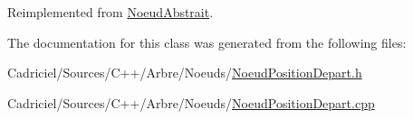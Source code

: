 Reimplemented from \hyperlink{group__inf2990_gadc6ebe69894dbb682fdd0ecb1b6c11e9}{Noeud\-Abstrait}.



The documentation for this class was generated from the following files\-:\begin{DoxyCompactItemize}
\item 
Cadriciel/\-Sources/\-C++/\-Arbre/\-Noeuds/\hyperlink{_noeud_position_depart_8h}{Noeud\-Position\-Depart.\-h}\item 
Cadriciel/\-Sources/\-C++/\-Arbre/\-Noeuds/\hyperlink{_noeud_position_depart_8cpp}{Noeud\-Position\-Depart.\-cpp}\end{DoxyCompactItemize}
